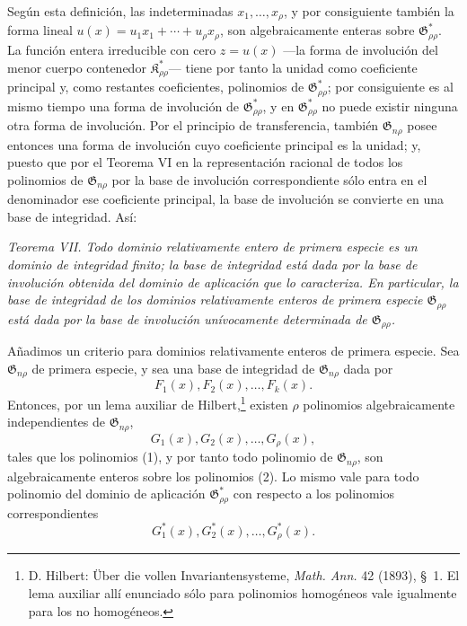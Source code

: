 \documentclass[11pt]{article}
\providecommand{\Kfield}{\mathfrak{K}}
\providecommand{\Gdom}{\mathfrak{G}}
\begin{document}
Según esta definición, las indeterminadas $x_1,\ldots,x_\rho$, y por consiguiente también la forma lineal $u(x)=u_1x_1+\cdots+u_\rho x_\rho$, son algebraicamente enteras sobre $\Gdom^*_{\rho\rho}$. La función entera irreducible con cero $z=u(x)$ ---la forma de involución del menor cuerpo contenedor $\Kfield^*_{\rho\rho}$--- tiene por tanto la unidad como coeficiente principal y, como restantes coeficientes, polinomios de $\Gdom^*_{\rho\rho}$; por consiguiente es al mismo tiempo una forma de involución de $\Gdom^*_{\rho\rho}$, y en $\Gdom^*_{\rho\rho}$ no puede existir ninguna otra forma de involución. Por el principio de transferencia, también $\Gdom_{n\rho}$ posee entonces una forma de involución cuyo coeficiente principal es la unidad; y, puesto que por el Teorema VI en la representación racional de todos los polinomios de $\Gdom_{n\rho}$ por la base de involución correspondiente sólo entra en el denominador ese coeficiente principal, la base de involución se convierte en una base de integridad. Así:

\emph{Teorema VII. Todo dominio relativamente entero de primera especie es un dominio de integridad finito; la base de integridad está dada por la base de involución obtenida del dominio de aplicación que lo caracteriza. En particular, la base de integridad de los dominios relativamente enteros de primera especie $\Gdom_{\rho\rho}$ está dada por la base de involución unívocamente determinada de $\Gdom_{\rho\rho}$.}

Añadimos un criterio para dominios relativamente enteros de primera especie. Sea $\Gdom_{n\rho}$ de primera especie, y sea una base de integridad de $\Gdom_{n\rho}$ dada por
\begin{equation}
  F_1(x),F_2(x),\ldots,F_k(x).
\tag{1}
\end{equation}
Entonces, por un lema auxiliar de Hilbert,\footnote{D. Hilbert: Über die vollen Invariantensysteme, \emph{Math. Ann.} 42 (1893), \S\ 1. El lema auxiliar allí enunciado sólo para polinomios homogéneos vale igualmente para los no homogéneos.} existen $\rho$ polinomios algebraicamente independientes de $\Gdom_{n\rho}$,
\begin{equation}
  G_1(x),G_2(x),\ldots,G_\rho(x),
\tag{2}
\end{equation}
tales que los polinomios (1), y por tanto todo polinomio de $\Gdom_{n\rho}$, son algebraicamente enteros sobre los polinomios (2). Lo mismo vale para todo polinomio del dominio de aplicación $\Gdom^*_{\rho\rho}$ con respecto a los polinomios correspondientes
\begin{equation}
  G_1^*(x),G_2^*(x),\ldots,G_\rho^*(x).
\tag{3}
\end{equation}
\end{document}
